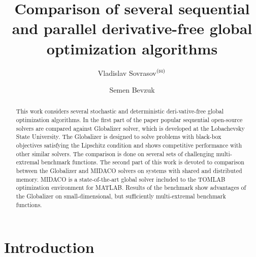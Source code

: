 \documentclass{svproc}
\def\letter{$^{\textrm{(\Letter)}}$}
\begin{document}
\mainmatter              %
%
\title{Comparison of several sequential and parallel derivative-free global optimization algorithms}
%
%
\author{Vladislav Sovrasov\letter \and Semen Bevzuk}
%
%
%

\maketitle              %

\begin{abstract}
This work considers several stochastic and deterministic deri-vative-free global optimization
algorithms. In the first part of the paper popular sequential open-source solvers are compared against
Globalizer solver, which is developed at the Lobachevsky State University. The Globalizer is
designed to solve problems with black-box objectives satisfying the Lipschitz condition and shows
competitive performance with other similar solvers. The comparison is done on several sets of
challenging multi-extremal benchmark functions. The second part of this work is devoted to
comparison between the Globalizer and MIDACO solvers on systems with shared and distributed
memory. MIDACO is a state-of-the-art global solver included to the TOMLAB optimization
environment for MATLAB. Results of the benchmark show advantages of the Globalizer on small-dimensional, but sufficiently multi-extremal benchmark functions.
\end{abstract}
%
\section{Introduction}
\end{document}
